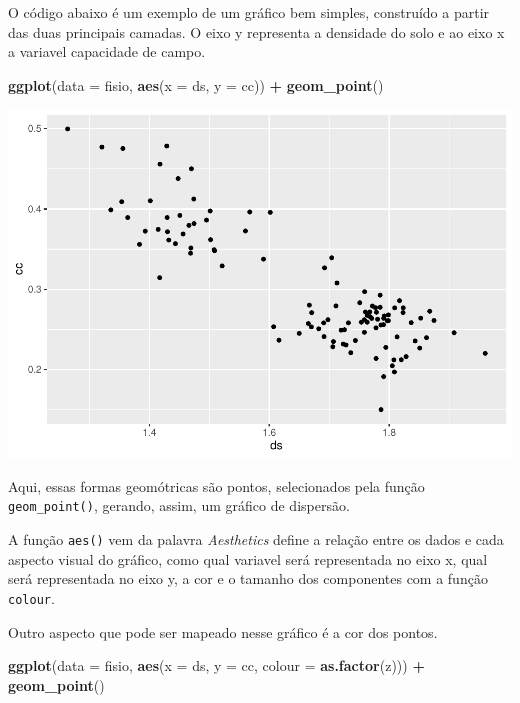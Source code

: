 \documentclass[
]{book}
\newenvironment{Shaded}{\begin{snugshade}}{\end{snugshade}}
\newcommand{\DataTypeTok}[1]{\textcolor[rgb]{0.13,0.29,0.53}{#1}}
\newcommand{\KeywordTok}[1]{\textcolor[rgb]{0.13,0.29,0.53}{\textbf{#1}}}
\newcommand{\NormalTok}[1]{#1}
\newcommand{\OperatorTok}[1]{\textcolor[rgb]{0.81,0.36,0.00}{\textbf{#1}}}
\newcommand{\StringTok}[1]{\textcolor[rgb]{0.31,0.60,0.02}{#1}}
\begin{document}
O código abaixo é um exemplo de um gráfico bem simples, construído a partir das duas principais camadas. O eixo y representa a densidade do solo e ao eixo x a variavel capacidade de campo.

\begin{Shaded}
\begin{Highlighting}[]
\KeywordTok{ggplot}\NormalTok{(}\DataTypeTok{data =}\NormalTok{ fisio, }\KeywordTok{aes}\NormalTok{(}\DataTypeTok{x =}\NormalTok{ ds, }\DataTypeTok{y =}\NormalTok{ cc)) }\OperatorTok{+}
\StringTok{  }\KeywordTok{geom_point}\NormalTok{()}
\end{Highlighting}
\end{Shaded}

\includegraphics{TudodoR_files/figure-latex/unnamed-chunk-186-1.pdf}

Aqui, essas formas geomótricas são pontos, selecionados pela função \texttt{geom\_point()}, gerando, assim, um gráfico de dispersão.

A função \texttt{aes()} vem da palavra \emph{Aesthetics} define a relação entre os dados e cada aspecto visual do gráfico, como qual variavel será representada no eixo x, qual será representada no eixo y, a cor e o tamanho dos componentes com a função \texttt{colour}.

Outro aspecto que pode ser mapeado nesse gráfico é a cor dos pontos.

\begin{Shaded}
\begin{Highlighting}[]
\KeywordTok{ggplot}\NormalTok{(}\DataTypeTok{data =}\NormalTok{ fisio, }\KeywordTok{aes}\NormalTok{(}\DataTypeTok{x =}\NormalTok{ ds, }\DataTypeTok{y =}\NormalTok{ cc, }\DataTypeTok{colour =} \KeywordTok{as.factor}\NormalTok{(z))) }\OperatorTok{+}
\StringTok{  }\KeywordTok{geom_point}\NormalTok{()}
\end{Highlighting}
\end{Shaded}
\end{document}
